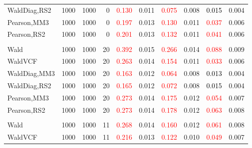 \documentclass[
]{article}
\begin{document}
\begin{table}[H]
{\begin{tabular}[t]{lrrrrrrlrr}
\hspace{1em}WaldDiag,RS2 & 1000 & 1000 & 0 & \textcolor{red}{0.130} & 0.011 & \textcolor{red}{0.075} & 0.008 & \textcolor{black}{0.015} & 0.004\\
\hspace{1em}Pearson,MM3 & 1000 & 1000 & 0 & \textcolor{red}{0.197} & 0.013 & \textcolor{red}{0.130} & 0.011 & \textcolor{red}{0.037} & 0.006\\
\hspace{1em}Pearson,RS2 & 1000 & 1000 & 0 & \textcolor{red}{0.201} & 0.013 & \textcolor{red}{0.132} & 0.011 & \textcolor{red}{0.041} & 0.006\\
\addlinespace[0.3em]
\multicolumn{10}{l}{\textbf{1F 15V}}\\
\hspace{1em}Wald & 1000 & 1000 & 20 & \textcolor{red}{0.392} & 0.015 & \textcolor{red}{0.266} & 0.014 & \textcolor{red}{0.088} & 0.009\\
\hspace{1em}WaldVCF & 1000 & 1000 & 20 & \textcolor{red}{0.263} & 0.014 & \textcolor{red}{0.154} & 0.011 & \textcolor{red}{0.033} & 0.006\\
\hspace{1em}WaldDiag,MM3 & 1000 & 1000 & 20 & \textcolor{red}{0.163} & 0.012 & \textcolor{red}{0.064} & 0.008 & \textcolor{black}{0.013} & 0.004\\
\hspace{1em}WaldDiag,RS2 & 1000 & 1000 & 20 & \textcolor{red}{0.165} & 0.012 & \textcolor{red}{0.072} & 0.008 & \textcolor{black}{0.015} & 0.004\\
\hspace{1em}Pearson,MM3 & 1000 & 1000 & 20 & \textcolor{red}{0.273} & 0.014 & \textcolor{red}{0.175} & 0.012 & \textcolor{red}{0.054} & 0.007\\
\hspace{1em}Pearson,RS2 & 1000 & 1000 & 20 & \textcolor{red}{0.273} & 0.014 & \textcolor{red}{0.178} & 0.012 & \textcolor{red}{0.063} & 0.008\\
\addlinespace[0.3em]
\multicolumn{10}{l}{\textbf{2F 10V}}\\
\hspace{1em}Wald & 1000 & 1000 & 11 & \textcolor{red}{0.268} & 0.014 & \textcolor{red}{0.160} & 0.012 & \textcolor{red}{0.061} & 0.008\\
\hspace{1em}WaldVCF & 1000 & 1000 & 11 & \textcolor{red}{0.216} & 0.013 & \textcolor{red}{0.122} & 0.010 & \textcolor{red}{0.049} & 0.007\\

\end{tabular}}
\end{table}
\end{document}
